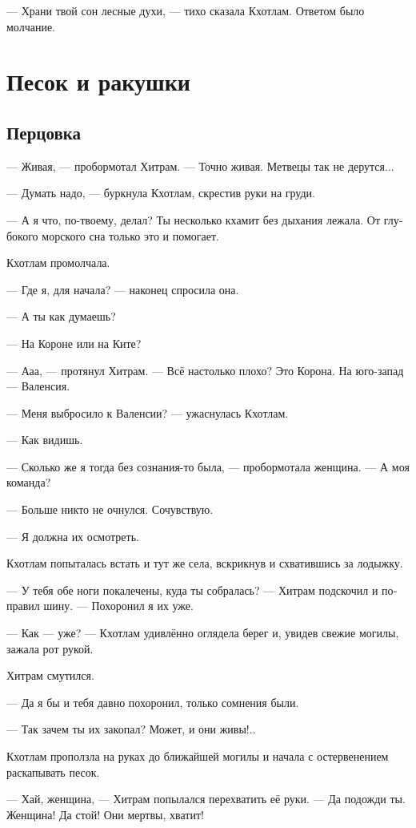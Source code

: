 \documentclass[a4paper,12pt,fleqn]{book}\usepackage{cooltooltips}\usepackage{polyglossia}\setdefaultlanguage[babelshorthands=true]{russian}\setotherlanguage{english}\defaultfontfeatures{Ligatures=TeX,Mapping=tex-text} \usepackage{xcolor}\definecolor{lightgray}{HTML}{bbbbbb}\color{lightgray}\newcommand{\ml}[3]{\textenglish{\textcolor{black}{#3}} }
\begin{document}
--- Храни твой сон лесные духи, --- тихо сказала Кхотлам.
Ответом было молчание.

\chapter{Песок и ракушки}

\section{Перцовка}

--- Живая, --- пробормотал Хитрам.
--- Точно живая.
Метвецы так не дерутся...

--- Думать надо, --- буркнула Кхотлам, скрестив руки на груди.

--- А я что, по-твоему, делал?
Ты несколько кхамит без дыхания лежала.
От глубокого морского сна только это и помогает.

Кхотлам промолчала.

--- Где я, для начала? --- наконец спросила она.

--- А ты как думаешь?

--- На Короне или на Ките?

--- Ааа, --- протянул Хитрам.
--- Всё настолько плохо?
Это Корона.
На юго-запад --- Валенсия.

--- Меня выбросило к Валенсии? --- ужаснулась Кхотлам.

--- Как видишь.

--- Сколько же я тогда без сознания-то была, --- пробормотала женщина.
--- А моя команда?

--- Больше никто не очнулся.
Сочувствую.

--- Я должна их осмотреть.

Кхотлам попыталась встать и тут же села, вскрикнув и схватившись за лодыжку.

--- У тебя обе ноги покалечены, куда ты собралась? --- Хитрам подскочил и поправил шину.
--- Похоронил я их уже.

--- Как --- уже? --- Кхотлам удивлённо оглядела берег и, увидев свежие могилы, зажала рот рукой.

Хитрам смутился.

--- Да я бы и тебя давно похоронил, только сомнения были.

--- Так зачем ты их закопал?
Может, и они живы!..

Кхотлам проползла на руках до ближайшей могилы и начала с остервенением раскапывать песок.

--- Хай, женщина, --- Хитрам попылался перехватить её руки.
--- Да подожди ты.
Женщина!
Да стой!
Они мертвы, хватит!
\end{document}
